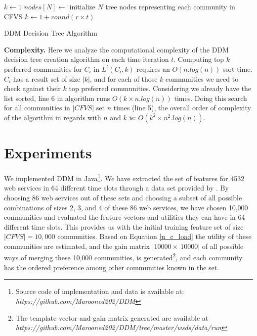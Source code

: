 \documentclass[10pt,journal,cspaper,compsoc]{IEEEtran}
\begin{document}
\begin{algorithm}
\DontPrintSemicolon
{}
$k \gets 1$\;
$nodes[N] \gets$ initialize $N$ tree nodes representing each community in CFVS\;
 {
	$k \gets 1 + round (r \times t)$\;
   {
	   {
		}
  }
}
\;
\caption{{\sc DDM Decision Tree Algorithm}}
\label{algo:dectree}
\end{algorithm}

\textbf{Complexity.} Here we analyze the computational complexity of the DDM decision tree creation algorithm on each time iteration $t$. Computing top $k$ preferred communities for $C_i$ in $L^t(C_i, k)$ requires an $O(n.log(n))$ sort time. $C_i$ has a result set of size $|k|$, and for each of those $k$ communities we need to check against their $k$ top preferred communities. Considering we already have the list sorted, line 6 in algorithm runs $O(k \times n.log(n))$ times. Doing this search for all communities in $|CFVS|$ set $n$ times (line 5), the overall order of complexity of the algorithm in regards with $n$ and $k$ is: $O(k^2 \times n^2.log(n))$.

\section{Experiments}\label{s:experiments}
We implemented DDM in Java\footnote{Source code of implementation and data is available at: \emph{https://github.com/Marooned202/DDM}}. We have extracted the set of features for 4532 web services in 64 different time slots through a data set provided by \cite{10.1109/ISSRE.2011.17}. By choosing 86 web services out of these sets and choosing a subset of all possible combinations of sizes 2, 3, and 4 of these 86 web services, we have chosen 10,000 communities and evaluated the feature vectors and utilities they can have in 64 different time slots. This provides us with the initial training feature set of size $|CFVS| = 10,000$ communities. Based on Equation \ref{u_c_load} the utility of these communities are estimated, and the gain matrix $|10000 \times~ 10000|$ of all possible ways of merging these 10,000 communities, is generated\footnote {The template vector and gain matrix generated are available at \emph{https://github.com/Marooned202/DDM/tree/master/wsds/data/run}}, and each community has the ordered preference among other communities known in the set. 
\end{document}
